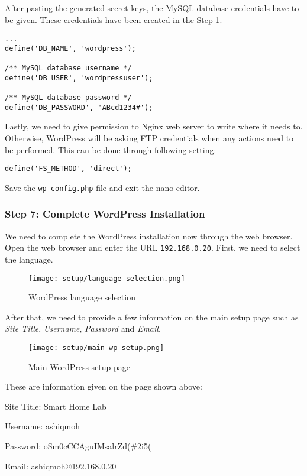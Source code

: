 After pasting the generated secret keys, the MySQL database credentials have to be given. These credentials have been created in the Step 1.
\begin{lstlisting}
...
define('DB_NAME', 'wordpress');

/** MySQL database username */
define('DB_USER', 'wordpressuser');

/** MySQL database password */
define('DB_PASSWORD', 'ABcd1234#');
\end{lstlisting}

Lastly, we need to give permission to Nginx web server to write where it needs to. Otherwise, WordPress will be asking FTP credentials when any actions need to be performed. This can be done through following setting:
\begin{lstlisting}
define('FS_METHOD', 'direct');
\end{lstlisting}

Save the \texttt{wp-config.php} file and exit the nano editor.

\subsubsection*{Step 7: Complete WordPress Installation}
We need to complete the WordPress installation now through the web browser. Open the web browser and enter the URL \texttt{192.168.0.20}. First, we need to select the language.

\begin{figure}[ht]
\caption{WordPress language selection}
\label{fig:wordpress-language-selection}
\centering
\texttt{[image: setup/language-selection.png]}
\end{figure}

After that, we need to provide a few information on the main setup page such as \emph{Site Title}, \emph{Username}, \emph{Password} and \emph{Email}.

\begin{figure}[ht]
\caption{Main WordPress setup page}
\centering
\texttt{[image: setup/main-wp-setup.png]}
\end{figure}

These are information given on the page shown above:
\begin{itemize*}
\item Site Title: Smart Home Lab
\item Username: ashiqmoh
\item Password: oSm0cCCAguIMsalrZd(\#2i5(
\item Email: ashiqmoh@192.168.0.20
\end{itemize*}

